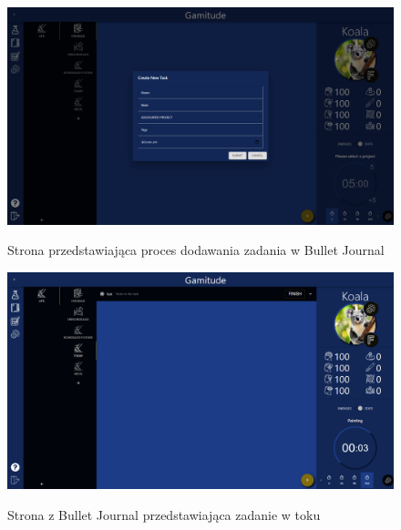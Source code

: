 \documentclass[a4paper,11pt]{report}
\begin{document}
\begin{figure}[H]
	\centering
	\includegraphics[scale=0.3]{prezentacja/ProjectTask_add}\\
	\caption{Strona przedstawiająca proces dodawania zadania w Bullet Journal}
	\label{fig:ProjectTask_add}
\end{figure}
\begin{figure}[H]
	\centering
	\includegraphics[scale=0.3]{prezentacja/Bullet_Session}\\
	\caption{Strona z Bullet Journal przedstawiająca zadanie w toku}
	\label{fig:Bullet_Session}
\end{figure}
\end{document}
